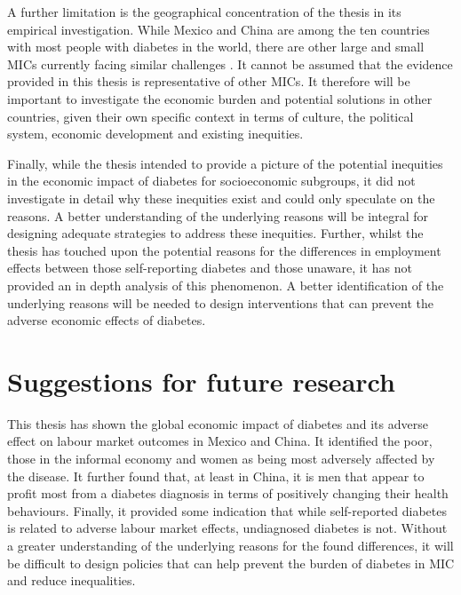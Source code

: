 A further limitation is the geographical concentration of the thesis in its empirical investigation. While Mexico and China are among the ten countries with most people with diabetes in the world, there are other large and small \acp{MIC} currently facing similar challenges \parencite{Risk2016}.  It cannot be assumed that the evidence provided in this thesis is representative of other \acp{MIC}. It therefore will be important to investigate the economic burden and potential solutions in other countries, given their own specific context in terms of culture, the political system, economic development and existing inequities.

Finally, while the thesis intended to provide a picture of the potential inequities in the economic impact of diabetes for socioeconomic subgroups, it did not investigate in detail why these inequities exist and could only speculate on the reasons. A better understanding of the underlying reasons will be integral for designing adequate strategies to address these inequities. Further, whilst the thesis has touched upon the potential reasons for the differences in employment effects between those self-reporting diabetes and those unaware, it has not provided an in depth analysis of this phenomenon. A better identification of the underlying reasons will be needed to design interventions that can prevent the adverse economic effects of diabetes. 



\section{Suggestions for future research}

This thesis has shown the global economic impact of diabetes and its adverse effect on labour market outcomes in Mexico and China. It identified the poor, those in the informal economy and women as being most adversely affected by the disease. It further found that, at least in China, it is men that appear to profit most from a diabetes diagnosis in terms of positively changing their health behaviours. Finally, it provided some indication that while self-reported diabetes is related to adverse labour market effects, undiagnosed diabetes is not. Without a greater understanding of the underlying reasons for the found differences, it will be difficult to design policies that can help prevent the burden of diabetes in \ac{MIC} and reduce inequalities.

